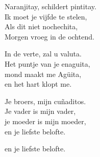\clearpage
\begin{translation}
Naranjitay, schildert pintitay.\\
Ik moet je vijfde te stelen,\\
Als dit niet nochechita,\\
Morgen vroeg in de ochtend.\vspace{\wlskip}

In de verte, zal u valuta.\\
Het puntje van je enaguita,\\
mond maakt me Agüita,\\
en het hart klopt me.\vspace{\wlskip}

Je broers, mijn cuñaditos.\\
Je vader is mijn vader,\\
je moeder is mijn moeder,\\
en je liefste belofte.\vspace{\wlskip}

en je liefste belofte.
\end{translation}
